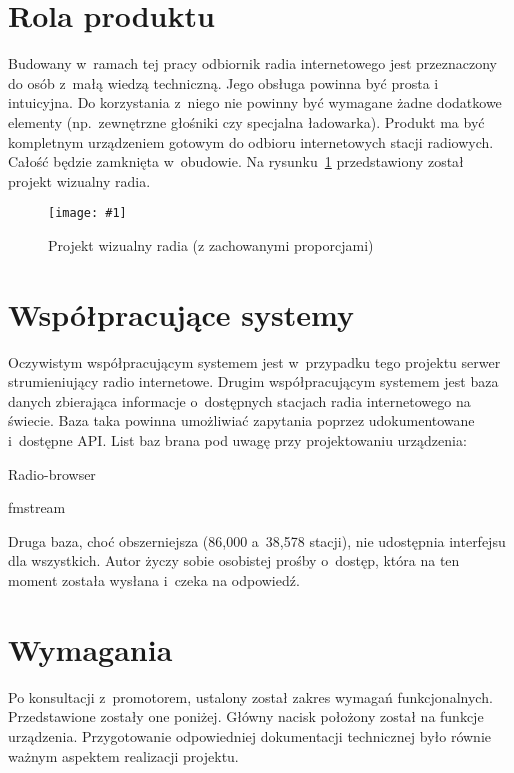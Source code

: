 \documentclass[polish]{aghengthesis}
\let\tempone\itemize
\let\temptwo\enditemize
\renewenvironment{itemize}{\tempone\setlength{\itemsep}{0cm}}{\temptwo}
\newcommand{\imgint}[4]{
	\begin{figure}[{#4}]
		\centering
		\texttt{[image: \#1]}
		\caption{#2}
		\label{#1}
	\end{figure}
}
\newcommand{\imgh}[3]{\imgint{#1}{#2}{#3}{H}}
\begin{document}
	\section{Rola produktu}
		Budowany w~ramach tej pracy odbiornik radia internetowego jest przeznaczony do osób z~małą wiedzą techniczną. Jego obsługa powinna być prosta i~ intuicyjna. Do korzystania z~niego nie powinny być wymagane żadne dodatkowe elementy (np.~zewnętrzne głośniki czy specjalna ładowarka).
		Produkt ma być kompletnym urządzeniem gotowym do odbioru internetowych stacji radiowych. Całość będzie zamknięta w~obudowie. Na rysunku~\ref{1/radio_proj_trimmed} przedstawiony został projekt wizualny radia.
		
		\imgh{1/radio_proj_trimmed}{Projekt wizualny radia (z zachowanymi proporcjami)}{0.7}
		
	\section{Współpracujące systemy}
		Oczywistym współpracującym systemem jest w~przypadku tego projektu serwer strumieniujący radio internetowe.
		Drugim współpracującym systemem jest baza danych zbierająca informacje o~dostępnych stacjach radia internetowego na świecie. Baza taka powinna umożliwiać zapytania poprzez udokumentowane i~dostępne API. List baz brana pod uwagę przy projektowaniu urządzenia:
		\begin{itemize}
			\item Radio-browser\textsuperscript{\cite{radio-browser}}
			\item fmstream\textsuperscript{\cite{fmstream}}
		\end{itemize}
		
		Druga baza, choć obszerniejsza (86,000 a~38,578 stacji), nie udostępnia interfejsu dla wszystkich. Autor życzy sobie osobistej prośby o~dostęp, która na ten moment została wysłana i~czeka na odpowiedź.
		
	\section{Wymagania}
		Po konsultacji z~promotorem, ustalony został zakres wymagań funkcjonalnych. Przedstawione zostały one poniżej. Główny nacisk położony został na funkcje urządzenia.
		Przygotowanie odpowiedniej dokumentacji technicznej było równie ważnym aspektem realizacji projektu.
	
\end{document}
